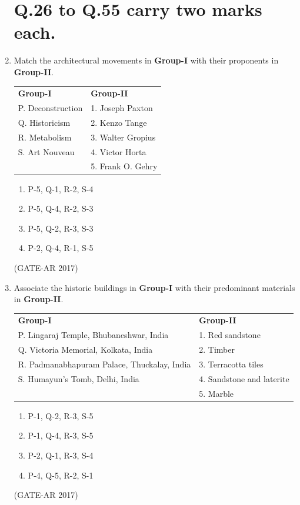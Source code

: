 \documentclass[a4paper,10pt]{article}
\begin{document}
\begin{enumerate}
\section*{Q.26 to Q.55 carry two marks each.}

    \item Match the architectural movements in \textbf{Group-I} with their proponents in \textbf{Group-II}. \\
    \begin{tabular}{ l l }
	\textbf{Group-I} & \textbf{Group-II} \\
	P. Deconstruction & 1. Joseph Paxton \\
	Q. Historicism & 2. Kenzo Tange \\
	R. Metabolism & 3. Walter Gropius \\
	S. Art Nouveau & 4. Victor Horta \\
	& 5. Frank O. Gehry \\
	\end{tabular}
	\begin{multicols}{2}
	\begin{enumerate}
        \item P-5, Q-1, R-2, S-4
        \item P-5, Q-4, R-2, S-3
        \item P-5, Q-2, R-3, S-3
        \item P-2, Q-4, R-1, S-5
    \end{enumerate}
	\end{multicols}
    \hfill (GATE-AR 2017)
    
    \item Associate the historic buildings in \textbf{Group-I} with their predominant materials in \textbf{Group-II}. \\
    \begin{tabular}{ l l }
	\textbf{Group-I} & \textbf{Group-II} \\
	P. Lingaraj Temple, Bhubaneshwar, India & 1. Red sandstone \\
	Q. Victoria Memorial, Kolkata, India & 2. Timber \\
	R. Padmanabhapuram Palace, Thuckalay, India & 3. Terracotta tiles \\
	S. Humayun's Tomb, Delhi, India & 4. Sandstone and laterite \\
	& 5. Marble \\
	\end{tabular}
	\begin{multicols}{2}
	\begin{enumerate}
        \item P-1, Q-2, R-3, S-5
        \item P-1, Q-4, R-3, S-5
        \item P-2, Q-1, R-3, S-4
        \item P-4, Q-5, R-2, S-1
    \end{enumerate}
	\end{multicols}
    \hfill (GATE-AR 2017)
    

\end{enumerate}
\end{document}
